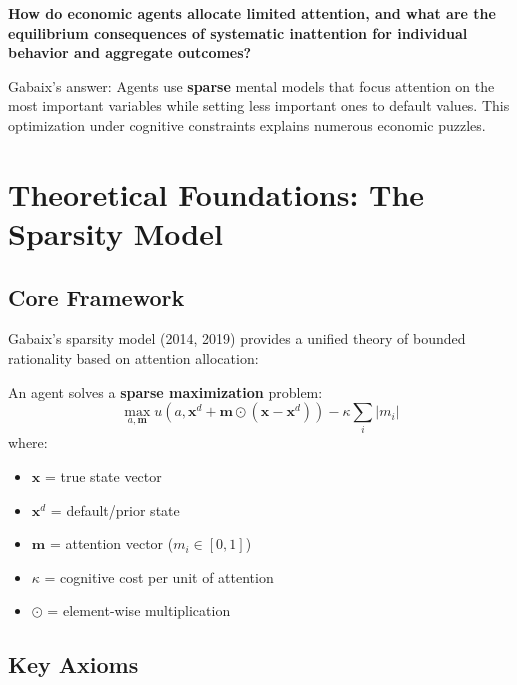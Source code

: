 \begin{tcolorbox}[colback=red!5!white, colframe=red!75!black, title=Central Question]
\textbf{How do economic agents allocate limited attention, and what are the equilibrium consequences of systematic inattention for individual behavior and aggregate outcomes?}
\end{tcolorbox}

Gabaix's answer: Agents use \textbf{sparse} mental models that focus attention on the most important variables while setting less important ones to default values. This optimization under cognitive constraints explains numerous economic puzzles.

\section{Theoretical Foundations: The Sparsity Model}

\subsection{Core Framework}

Gabaix's sparsity model (2014, 2019) provides a unified theory of bounded rationality based on attention allocation:

\begin{definition}
An agent solves a \textbf{sparse maximization} problem:
\begin{equation}
\max_{a, \mathbf{m}} u(a, \mathbf{x}^d + \mathbf{m} \odot (\mathbf{x} - \mathbf{x}^d)) - \kappa \sum_i |m_i|
\end{equation}
where:
\begin{itemize}
    \item $\mathbf{x}$ = true state vector
    \item $\mathbf{x}^d$ = default/prior state
    \item $\mathbf{m}$ = attention vector ($m_i \in [0,1]$)
    \item $\kappa$ = cognitive cost per unit of attention
    \item $\odot$ = element-wise multiplication
\end{itemize}
\end{definition}

\subsection{Key Axioms}

